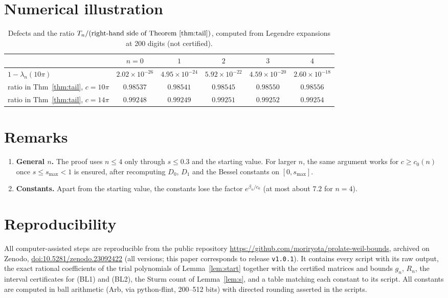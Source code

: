 \documentclass[11pt]{amsart}
\newcommand{\doi}[1]{\href{https://doi.org/#1}{doi:#1}}
\theoremstyle{remark}
\numberwithin{equation}{section}
\begin{document}
\section{Numerical illustration}

\begin{table}[h]
\centering
\begin{tabular}{lccccc}
\toprule
& $n=0$ & $1$ & $2$ & $3$ & $4$\\
\midrule
$1-\lambda_n(10\pi)$ & $2.02\times10^{-26}$ & $4.95\times10^{-24}$ & $5.92\times10^{-22}$ & $4.59\times10^{-20}$ & $2.60\times10^{-18}$\\
ratio in Thm~\ref{thm:tail}, $c=10\pi$ & $0.98537$ & $0.98541$ & $0.98545$ & $0.98550$ & $0.98556$\\
ratio in Thm~\ref{thm:tail}, $c=14\pi$ & $0.99248$ & $0.99249$ & $0.99251$ & $0.99252$ & $0.99254$\\
\bottomrule
\end{tabular}
\caption{Defects and the ratio $T_n/(\text{right-hand side of Theorem~\ref{thm:tail}})$, computed from Legendre expansions at 200 digits (not certified).}\label{tab:num}
\end{table}

\section{Remarks}
\begin{enumerate}
\item \textbf{General $n$.} The proof uses $n\le4$ only through $s\le0.3$ and the starting value. For larger $n$, the same argument works for $c\ge c_0(n)$ once $s\le s_{\max}<1$ is ensured, after recomputing $D_0$, $D_1$ and the Bessel constants on $[0,s_{\max}]$.
\item \textbf{Constants.} Apart from the starting value, the constants lose the factor $e^{\beta_n/c_0}$ (at most about $7.2$ for $n=4$).
\end{enumerate}

\section*{Reproducibility}
All computer-assisted steps are reproducible from the public repository \url{https://github.com/moriryota/prolate-weil-bounds}, archived on Zenodo, \doi{10.5281/zenodo.23092422} (all versions; this paper corresponds to release \texttt{v1.0.1}). It contains every script with its raw output, the exact rational coefficients of the trial polynomials of Lemma~\ref{lem:start} together with the certified matrices and bounds $g_n$, $R_n$, the interval certificates for (BL1) and (BL2), the Sturm count of Lemma~\ref{lem:s}, and a table matching each constant to its script. All constants are computed in ball arithmetic (Arb, via python-flint, 200--512 bits) with directed rounding asserted in the scripts.
\end{document}
